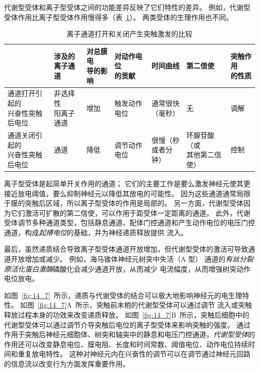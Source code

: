 代谢型受体和离子型受体之间的功能差异反映了它们特性的差异。
例如，代谢型受体作用比离子型受体作用慢得多（表~\ref{tab:14_1}）。
两类受体的生理作用也不同。


\begin{table}[htbp]
	\caption{离子通道打开和关闭产生突触激发的比较} \label{tab:14_1} \centering
	\begin{tabular}{lllllll}
		\toprule
		 & \makecell[l]{涉及的\\离子通道} & \makecell[l]{对总膜电\\导的影响} & \makecell[l]{对动作电位\\的贡献} & 时间曲线 & 第二信使 & \makecell[l]{突触作用\\的性质} \\
		\midrule
		\makecell[l]{通道打开引起的\\兴奋性突触后电位} & \makecell[l]{非选择性\\阳离子通道} & 增加 & 触发动作电位 & \makecell[l]{通常很快\\（毫秒）} & 无 & 调解\\
		\midrule
		\makecell[l]{通道关闭引起的\\兴奋性突触后电位} & \ce{K+} 通道 & 降低 & 调节动作电位 & \makecell[l]{很慢（秒\\或者分钟）} & \makecell[l]{环腺苷酸（或\\其他第二信使）} & 控制 \\
		\bottomrule
	\end{tabular}
\end{table}


离子型受体是起简单开关作用的通道；
它们的主要工作是要么激发神经元使其更接近放电阈值，要么抑制神经元以降低其放电的可能性。
因为这些通道通常局限于膜的突触后区域，所以离子型受体的作用是局部的。
另一方面，代谢型受体因为它们激活可扩散的第二信使，可以作用于距受体一定距离的通道。
此外，代谢受体调节多种通道类型，包括静息通道、配体门控通道和产生动作电位的电压门控通道，构成\textit{起搏电位}的基础，并为神经递质释放提供  流入。


最后，虽然递质结合导致离子型受体通道开放增加，但代谢型受体的激活可导致通道开放增加或减少。
例如，海马锥体神经元树突中失活（A 型） 通道的\textit{有丝分裂原活化蛋白激酶}磷酸化会减少通道开放，从而减少  电流幅度，从而增强树突动作电位放电。


如图~\ref{fig:14_7}~所示，递质与代谢受体的结合可以极大地影响神经元的电生理特性。
如图~\ref{fig:14_7}A~所示，突触前末梢的代谢型受体可以通过调节  流入或突触释放过程本身的功效来改变递质释放。
如图~\ref{fig:14_7}B~所示，突触后细胞中的代谢型受体可以通过调节介导突触后电位的离子型受体来影响突触的强度。
通过作用于突触后神经元细胞体、树突和轴突中的静息和电压门控通道，\textit{代谢型受体}的作用还可以改变静息电位、膜电阻、长度和时间常数、阈值电位、动作电位持续时间和重复放电特性。
这种对神经元内在兴奋性的调节可以在调节通过神经元回路的信息流以改变行为方面发挥重要作用。


